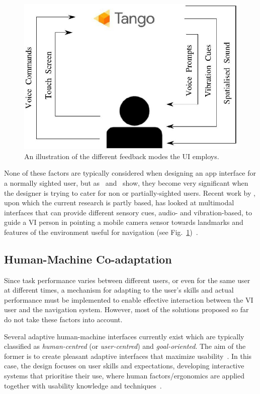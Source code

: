 \documentclass[letterpaper]{article}
\begin{document}
\begin{figure}
  \centering
  \includegraphics[width=0.8\columnwidth]{figures/multimodal.jpg}
  \caption{An illustration of the different feedback modes the UI employs.\label{fig:multimodal}}
\end{figure}

None of these factors are typically considered when designing an app interface for a normally sighted user, but as~\citeauthor{kane2011} and~\citeauthor{tian2013} show, they become very significant when the designer is trying to cater for non or partially-sighted users. Recent work by \citeauthor{bellotto2013}, upon which the current research is partly based, has looked at multimodal interfaces that can provide different sensory cues, audio- and vibration-based, to guide a VI person in pointing a mobile camera sensor towards landmarks and features of the environment useful for navigation (see Fig.~\ref{fig:multimodal})~\cite{bellotto2013}.

\subsection{Human-Machine Co-adaptation}\label{sec:co-adaptation}

Since task performance varies between different users, or even for the same user at different times, a mechanism for adapting to the user's skills and actual performance must be implemented to enable effective interaction between the VI user and the navigation system. However, most of the solutions proposed so far do not take these factors into account.

Several adaptive human-machine interfaces currently exist which are typically classified as \emph{human-centred} (or \emph{user-centred}) and \emph{goal-oriented}. The aim of the former is to create pleasant adaptive interfaces that maximize usability~\cite{Dixon2012}. In this case, the design focuses on user skills and expectations, developing interactive systems that prioritise their use, where human factors/ergonomics are applied together with usability knowledge and techniques~\cite{Jokela2003}.
\end{document}
